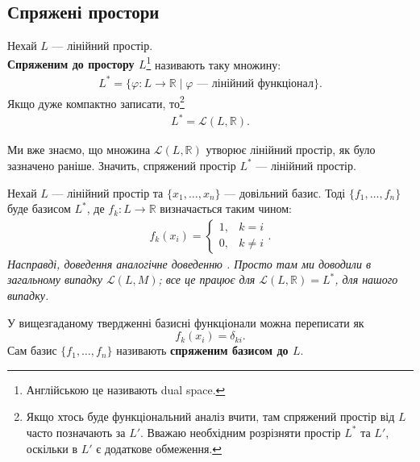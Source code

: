 \documentclass{math_library}
\begin{document}
\subsection{Спряжені простори}
\begin{definition}
Нехай $L$ --- лінійний простір.\\
\textbf{Спряженим до простору $L$}\footnote{Англійською це називають dual space.} називають таку множину:
\begin{align*}
L^* = \{ \varphi \colon L \to \mathbb{R} \mid \varphi \text{ --- лінійний функціонал} \}.
\end{align*}
Якщо дуже компактно записати, то\footnote{Якщо хтось буде функціональний аналіз вчити, там спряжений простір від $L$ часто позначають за $L'$. Вважаю необхідним розрізняти простір $L^*$ та $L'$, оскільки в $L'$ є додаткове обмеження.}
\begin{align*}
L^* = \mathcal{L}(L,\mathbb{R}).
\end{align*}
\end{definition}

\begin{remark}
Ми вже знаємо, що множина $\mathcal{L}(L,\mathbb{R})$ утворює лінійний простір, як було зазначено раніше. Значить, спряжений простір $L^*$ --- лінійний простір.
\end{remark}

\begin{proposition}
Нехай $L$ --- лінійний простір та $\{x_1,\dots,x_n\}$ --- довільний базис. Тоді $\{f_1,\dots,f_n\}$ буде базисом $L^*$, де $f_k \colon L \to \mathbb{R}$ визначається таким чином:
\begin{align*}
f_k(x_i) = \begin{cases} 1, & k = i \\ 0, & k \neq i \end{cases}.
\end{align*}
\textit{Насправді, доведення аналогічне доведенню . Просто там ми доводили в загальному випадку $\mathcal{L}(L,M)$; все це працює для $\mathcal{L}(L,\mathbb{R}) = L^*$, для нашого випадку.}
\end{proposition}

\begin{remark}
У вищезгаданому твердженні базисні функціонали можна переписати як \[
f_k(x_i) = \delta_{ki}.
\]
Сам базис $\{f_1,\dots,f_n\}$ називають \textbf{спряженим базисом до $L$}.
\end{remark}
\end{document}
